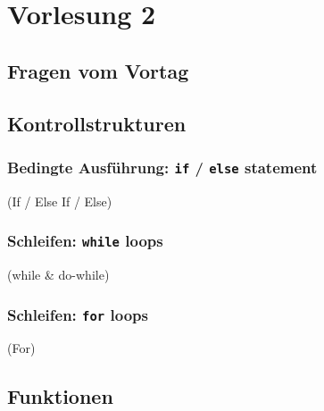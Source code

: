 \section{Vorlesung 2}

\setcounter{minutecounter}{0}

\subsection{Fragen vom Vortag}
\iflecturer
\begin{framed}
\end{framed}
\fi

\subsection{Kontrollstrukturen}
\iflecturer
\begin{framed}
\end{framed}
\fi

\subsubsection{Bedingte Ausführung: \texttt{if} / \texttt{else} statement}

\iflecturer
\begin{framed}
  \slide{} (If / Else If / Else)
\end{framed}
\fi


\subsubsection{Schleifen: \texttt{while} loops}

\iflecturer
\begin{framed}
   (while \& do-while)
\end{framed}
\fi

\subsubsection{Schleifen: \texttt{for} loops}

\iflecturer
\begin{framed}
   (For)
\end{framed}
\fi

\subsection{Funktionen}
\iflecturer
\begin{framed}
\end{framed}
\fi

